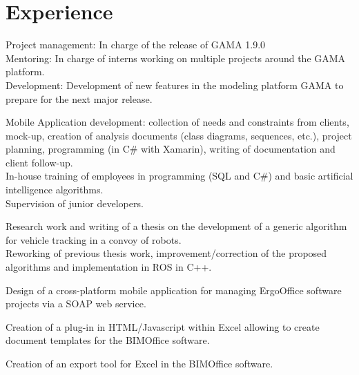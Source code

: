 \documentclass[letterpaper]{twentysecondcv - EN} %
\begin{document}

\section{Experience}

\begin{twenty}

	{
		Project management: In charge of the release of GAMA 1.9.0\\
		Mentoring: In charge of interns working on multiple projects around the GAMA platform.\\
		 Development: Development of new features in the modeling platform GAMA to prepare for the next major release.
	}
	
	{ 
		Mobile Application development: collection of needs and constraints from clients, mock-up, creation of analysis documents (class diagrams, sequences, etc.), project planning, programming (in C\# with Xamarin), writing of documentation and client follow-up.\\
		In-house training of employees in programming (SQL and C\#) and basic artificial intelligence algorithms. \\
		Supervision of junior developers.
	}
	 
	{
		Research work and writing of a thesis on the development of a generic algorithm for vehicle tracking in a convoy of robots. \\
		Reworking of previous thesis work, improvement/correction of the proposed algorithms and implementation in ROS in C++.
	}
	
	{
		Design of a cross-platform mobile application for managing ErgoOffice software projects via a SOAP web service.
	}
	
	{
		Creation of a plug-in in HTML/Javascript within Excel allowing to create document templates for the BIMOffice software.
	}

	
	{
		Creation of an export tool for Excel in the BIMOffice software.
	}

\end{twenty}
\end{document}
